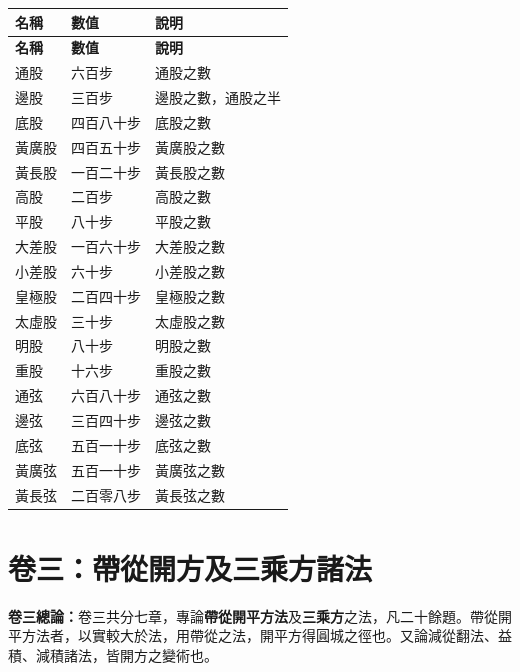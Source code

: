 \documentclass[11pt,a4paper]{article}
\begin{document}
\begin{center}
\begin{longtable}{|l|l|l|}
\hline
\textbf{名稱} & \textbf{數值} & \textbf{說明} \\
\hline
\endfirsthead
\hline
\textbf{名稱} & \textbf{數值} & \textbf{說明} \\
\hline
\endhead
通股 & 六百步 & 通股之數 \\
\hline
邊股 & 三百步 & 邊股之數，通股之半 \\
\hline
底股 & 四百八十步 & 底股之數 \\
\hline
黃廣股 & 四百五十步 & 黃廣股之數 \\
\hline
黃長股 & 一百二十步 & 黃長股之數 \\
\hline
高股 & 二百步 & 高股之數 \\
\hline
平股 & 八十步 & 平股之數 \\
\hline
大差股 & 一百六十步 & 大差股之數 \\
\hline
小差股 & 六十步 & 小差股之數 \\
\hline
皇極股 & 二百四十步 & 皇極股之數 \\
\hline
太虛股 & 三十步 & 太虛股之數 \\
\hline
明股 & 八十步 & 明股之數 \\
\hline
重股 & 十六步 & 重股之數 \\
\hline
通弦 & 六百八十步 & 通弦之數 \\
\hline
邊弦 & 三百四十步 & 邊弦之數 \\
\hline
底弦 & 五百一十步 & 底弦之數 \\
\hline
黃廣弦 & 五百一十步 & 黃廣弦之數 \\
\hline
黃長弦 & 二百零八步 & 黃長弦之數 \\
\hline
\end{longtable}
\end{center}

\clearpage


\section{卷三：帶從開方及三乘方諸法}

\noindent
\textbf{卷三總論：}卷三共分七章，專論\textbf{帶從開平方法}及\textbf{三乘方}之法，凡二十餘題。帶從開平方法者，以實較大於法，用帶從之法，開平方得圓城之徑也。又論減從翻法、益積、減積諸法，皆開方之變術也。
\end{document}
